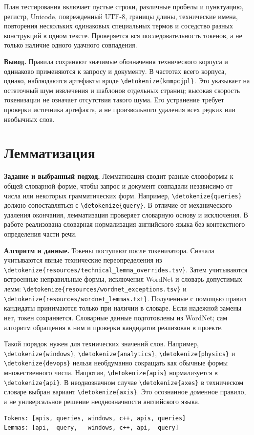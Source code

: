 \documentclass[pdf,unicode,12pt,a4paper,oneside,fleqn]{article}
\newcommand{\labsection}[2]{\par\Needspace{9\baselineskip}\setcounter{section}{\numexpr#1-1\relax}\section{#2}}
\newcommand{\partlabel}[1]{\par\Needspace{4\baselineskip}\medskip\textbf{#1.}\quad}
\DeclareRobustCommand{\code}[1]{\expandafter\nolinkurl\expandafter{\detokenize{#1}}}
\begin{document}
План тестирования включает пустые строки, различные пробелы и пунктуацию,
регистр, Unicode, поврежденный UTF-8, границы длины, технические имена,
повторения нескольких одинаковых специальных термов и соседство разных
конструкций в одном тексте. Проверяется вся последовательность токенов,
а не только наличие одного удачного совпадения.

\partlabel{Вывод}
Правила сохраняют значимые обозначения технического корпуса и одинаково
применяются к запросу и документу. В частотах всего корпуса, однако,
наблюдаются артефакты вроде \code{kmmpcjpl}. Это указывает на остаточный шум
извлечения и шаблонов отдельных страниц; высокая скорость токенизации не
означает отсутствия такого шума. Его устранение требует проверки источника
артефакта, а не произвольного удаления всех редких или необычных слов.

\labsection{4}{Лемматизация}

\partlabel{Задание и выбранный подход}
Лемматизация сводит разные словоформы к общей словарной форме, чтобы запрос
и документ совпадали независимо от числа или некоторых грамматических форм.
Например, \code{queries} должно сопоставляться с \code{query}. В отличие
от механического удаления окончания, лемматизация проверяет словарную основу
и исключения. В работе реализована словарная нормализация английского языка
без контекстного определения части речи.

\partlabel{Алгоритм и данные}
Токены поступают после токенизатора. Сначала учитываются явные технические
переопределения из \code{resources/technical_lemma_overrides.tsv}.
Затем учитываются встроенные неправильные формы, исключения WordNet
и словарь допустимых лемм:
\code{resources/wordnet_exceptions.tsv} и
\code{resources/wordnet_lemmas.txt}. Полученные с помощью правил кандидаты
принимаются только при наличии в словаре. Если надежной замены нет,
токен сохраняется. Словарные данные подготовлены из WordNet; сам алгоритм
обращения к ним и проверки кандидатов реализован в проекте.

Такой порядок нужен для технических значений слов. Например,
\code{windows}, \code{analytics}, \code{physics} и \code{devops} нельзя
необдуманно сокращать как обычные формы множественного числа.
Напротив, \code{apis} нормализуется в \code{api}. В неоднозначном случае
\code{axes} в техническом словаре выбран вариант \code{axis}.
Это осознанное доменное правило, а не универсальное решение неоднозначности
английского языка.

\begin{lstlisting}
Tokens: [apis, queries, windows, c++, apis, queries]
Lemmas: [api,  query,   windows, c++, api,  query]
\end{lstlisting}
\end{document}
